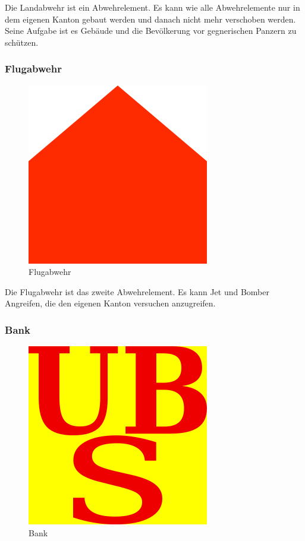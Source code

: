 \documentclass[ngerman, 12pt, pdftex]{scrartcl}[2006/07/30]
\begin{document}
Die Landabwehr ist ein Abwehrelement. Es kann wie alle Abwehrelemente nur in dem eigenen Kanton gebaut werden und danach nicht mehr verschoben werden. Seine Aufgabe ist es Gebäude und die Bevölkerung vor gegnerischen Panzern zu schützen.


\newpage

\subsubsection{Flugabwehr}

\begin{figure}[h]
\centering
\includegraphics[scale=18]{spiel/Flugabwehr.png}
\caption{Flugabwehr}
\end{figure}

Die Flugabwehr ist das zweite Abwehrelement. Es kann Jet und Bomber Angreifen, die den eigenen Kanton versuchen anzugreifen.


\subsubsection{Bank}

\begin{figure}[h]
\centering
\includegraphics[scale=1.8]{spiel/Bank.png}
\caption{Bank}
\end{figure}
\end{document}
